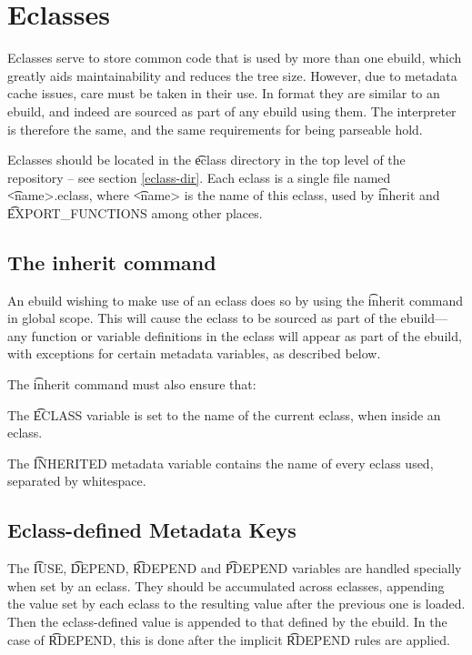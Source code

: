 \chapter{Eclasses}
\label{eclasses}

Eclasses serve to store common code that is used by more than one ebuild, which greatly aids
maintainability and reduces the tree size. However, due to metadata cache issues, care must be taken
in their use. In format they are similar to an ebuild, and indeed are sourced as part of any ebuild
using them. The interpreter is therefore the same, and the same requirements for being parseable
hold.

Eclasses should be located in the \t{eclass} directory in the top level of the repository -- see
section \ref{eclass-dir}. Each eclass is a single file named \t{<name>.eclass}, where \t{<name>} is
the name of this eclass, used by \t{inherit} and \t{EXPORT\_FUNCTIONS} among other places.

\section{The inherit command}

An ebuild wishing to make use of an eclass does so by using the \t{inherit} command in global scope.
This will cause the eclass to be sourced as part of the ebuild---any function or variable
definitions in the eclass will appear as part of the ebuild, with exceptions for certain metadata
variables, as described below.

The \t{inherit} command must also ensure that:

\begin{bulletlist}
\item The \t{ECLASS} variable is set to the name of the current eclass, when inside an eclass.
\item The \t{INHERITED} metadata variable contains the name of every eclass used, separated
    by whitespace.
\end{bulletlist}

\section{Eclass-defined Metadata Keys}

The \t{IUSE}, \t{DEPEND}, \t{RDEPEND} and \t{PDEPEND} variables are handled specially
when set by an eclass. They should be accumulated across eclasses, appending the value set by each
eclass to the resulting value after the previous one is loaded. Then the eclass-defined value is
appended to that defined by the ebuild. In the case of \t{RDEPEND}, this is done after the
implicit \t{RDEPEND} rules are applied.

